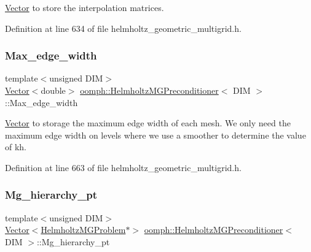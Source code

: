 \hyperlink{classoomph_1_1Vector}{Vector} to store the interpolation matrices. 



Definition at line 634 of file helmholtz\+\_\+geometric\+\_\+multigrid.\+h.

\mbox{\label{classoomph_1_1HelmholtzMGPreconditioner_a2ca185f62bdfff032503899ea2fbc22c}} 
\subsubsection{\texorpdfstring{Max\+\_\+edge\+\_\+width}{Max\_edge\_width}}
{\footnotesize\ttfamily template$<$unsigned D\+IM$>$ \\
\hyperlink{classoomph_1_1Vector}{Vector}$<$double$>$ \hyperlink{classoomph_1_1HelmholtzMGPreconditioner}{oomph\+::\+Helmholtz\+M\+G\+Preconditioner}$<$ D\+IM $>$\+::Max\+\_\+edge\+\_\+width\hspace{0.3cm}{\ttfamily [private]}}



\hyperlink{classoomph_1_1Vector}{Vector} to storage the maximum edge width of each mesh. We only need the maximum edge width on levels where we use a smoother to determine the value of kh. 



Definition at line 663 of file helmholtz\+\_\+geometric\+\_\+multigrid.\+h.

\mbox{\label{classoomph_1_1HelmholtzMGPreconditioner_a77c24f2c136211274a0f0326694eff51}} 
\subsubsection{\texorpdfstring{Mg\+\_\+hierarchy\+\_\+pt}{Mg\_hierarchy\_pt}}
{\footnotesize\ttfamily template$<$unsigned D\+IM$>$ \\
\hyperlink{classoomph_1_1Vector}{Vector}$<$\hyperlink{classoomph_1_1HelmholtzMGProblem}{Helmholtz\+M\+G\+Problem}$\ast$$>$ \hyperlink{classoomph_1_1HelmholtzMGPreconditioner}{oomph\+::\+Helmholtz\+M\+G\+Preconditioner}$<$ D\+IM $>$\+::Mg\+\_\+hierarchy\+\_\+pt\hspace{0.3cm}{\ttfamily [private]}}



